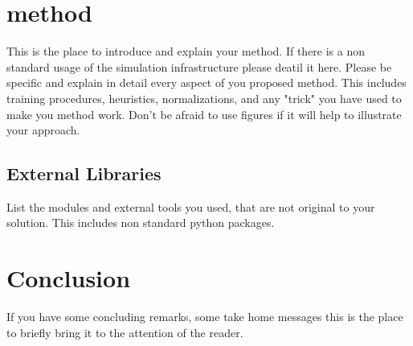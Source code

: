 \documentclass[letterpaper]{article} %
\begin{document}
\section{method}
This is the place to introduce and explain your method. If there is a non standard usage of the simulation infrastructure \cite{taitler2022pyrddlgym} please deatil it here.
Please be specific and explain in detail every aspect of you proposed method. This includes training procedures, heuristics, normalizations, and any "trick" you have used to make you method work. Don't be afraid to use figures if it will help to illustrate your approach.

\subsection{External Libraries}
List the modules and external tools you used, that are not original to your solution. This includes non standard python packages.


\section{Conclusion}
If you have some concluding remarks, some take home messages this is the place to briefly bring it to the attention of the reader.





\end{document}
